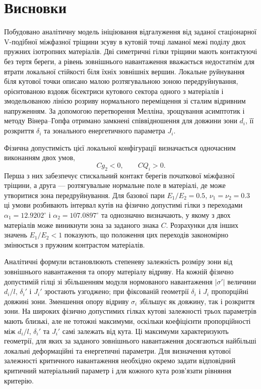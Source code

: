 \section{Висновки}
\label{sec:conclusions}

Побудовано аналітичну модель ініціювання відгалуження від заданої
стаціонарної V-подібної міжфазної тріщини зсуву в кутовій точці ламаної
межі поділу двох пружних ізотропних матеріалів. Дві симетричні гілки
тріщини мають контактуючі без тертя береги, а рівень зовнішнього
навантаження вважається недостатнім для втрати локальної стійкості біля
їхніх зовнішніх вершин. Локальне руйнування біля кутової точки описано
малою розтягувальною зоною передруйнування, орієнтованою вздовж
бісектриси кутового сектора одного з матеріалів і змодельованою лінією
розриву нормального переміщення зі сталим відривним напруженням. За допомогою перетворення
Мелліна, зрощування асимптотик і методу Вінера--Гопфа отримано замкнені
співвідношення для довжини зони $d_i$, її розкриття $\delta_i$ та
зонального енергетичного параметра $J_i$.

Фізична допустимість цієї локальної конфігурації визначається
одночасним виконанням двох умов,
\begin{equation*}
  Cg_2<0,\qquad CQ_i>0.
\end{equation*}
Перша з них забезпечує стискальний контакт берегів початкової міжфазної
тріщини, а друга --- розтягувальне нормальне поле в матеріалі, де може
утворитися зона передруйнування. Для базової пари
$E_1/E_2=0.5$, $\nu_1=\nu_2=0.3$ ці умови розбивають інтервал кутів на
фізично допустимі гілки з переходами
$\alpha_1=12.9202^\circ$ і $\alpha_2=107.0897^\circ$ та однозначно
визначають, у якому з двох матеріалів може виникнути зона за заданого
знака $C$. Розрахунки для інших значень $E_1/E_2<1$ показують, що
положення цих переходів закономірно змінюється з пружним контрастом
матеріалів.

Аналітичні формули встановлюють степеневу залежність розміру зони від
зовнішнього навантаження та опору матеріалу відриву. На кожній фізично
допустимій гілці зі збільшенням модуля нормованого навантаження
$|\sigma'|$ величини $d_i/l$, $\delta_i'$ і $J_i'$ зростають узгоджено;
при фіксованій геометрії $\delta_i$ і $J_i$ пропорційні довжині зони.
Зменшення опору відриву $\sigma_i$ збільшує як довжину, так і розкриття
зони. На широких фізично допустимих гілках кутові залежності трьох
параметрів мають близькі, але не тотожні максимуми, оскільки коефіцієнти
пропорційності між $d_i/l$, $\delta_i'$ та $J_i'$ самі залежать від
кута. Ці максимуми характеризують геометрії, для яких за заданого
зовнішнього навантаження досягаються найбільші локальні деформаційні та
енергетичні параметри. Для визначення кутової залежності критичного
навантаження необхідно окремо задати відповідний критичний матеріальний
параметр і для кожного кута розв'язати рівняння критерію.

